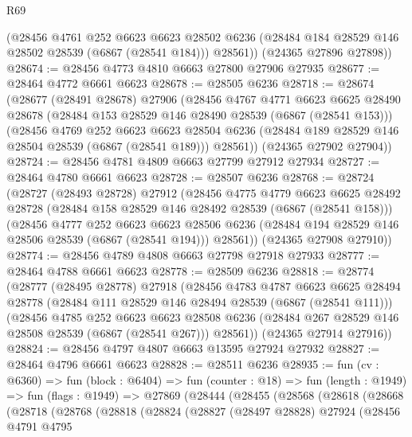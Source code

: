 \begin{lexlean}{R69}
\begin{coremodule}
{        (@28456
          @4761
          @252
          @6623
          @6623
          @28502
          @6236
          (@28484 @184 @28529 @146 @28502 @28539 (@6867 (@28541 @184)))
          @28561))
      (@24365 @27896 @27898))
@28674 := @28456 @4773 @4810 @6663 @27800 @27906 @27935
@28677 := @28464 @4772 @6661 @6623
@28678 := @28505 @6236
@28718 := @28674
    (@28677
      (@28491 @28678)
      @27906
      (@28456
        @4767
        @4771
        @6623
        @6625
        @28490
        @28678
        (@28484 @153 @28529 @146 @28490 @28539 (@6867 (@28541 @153)))
        (@28456
          @4769
          @252
          @6623
          @6623
          @28504
          @6236
          (@28484 @189 @28529 @146 @28504 @28539 (@6867 (@28541 @189)))
          @28561))
      (@24365 @27902 @27904))
@28724 := @28456 @4781 @4809 @6663 @27799 @27912 @27934
@28727 := @28464 @4780 @6661 @6623
@28728 := @28507 @6236
@28768 := @28724
    (@28727
      (@28493 @28728)
      @27912
      (@28456
        @4775
        @4779
        @6623
        @6625
        @28492
        @28728
        (@28484 @158 @28529 @146 @28492 @28539 (@6867 (@28541 @158)))
        (@28456
          @4777
          @252
          @6623
          @6623
          @28506
          @6236
          (@28484 @194 @28529 @146 @28506 @28539 (@6867 (@28541 @194)))
          @28561))
      (@24365 @27908 @27910))
@28774 := @28456 @4789 @4808 @6663 @27798 @27918 @27933
@28777 := @28464 @4788 @6661 @6623
@28778 := @28509 @6236
@28818 := @28774
    (@28777
      (@28495 @28778)
      @27918
      (@28456
        @4783
        @4787
        @6623
        @6625
        @28494
        @28778
        (@28484 @111 @28529 @146 @28494 @28539 (@6867 (@28541 @111)))
        (@28456
          @4785
          @252
          @6623
          @6623
          @28508
          @6236
          (@28484 @267 @28529 @146 @28508 @28539 (@6867 (@28541 @267)))
          @28561))
      (@24365 @27914 @27916))
@28824 := @28456 @4797 @4807 @6663 @13595 @27924 @27932
@28827 := @28464 @4796 @6661 @6623
@28828 := @28511 @6236
@28935 := fun (cv : @6360) =>
  fun (block : @6404) =>
  fun (counter : @18) =>
  fun (length : @1949) =>
  fun (flags : @1949) =>
  @27869
    (@28444
      (@28455
        (@28568
          (@28618
            (@28668
              (@28718
                (@28768
                  (@28818
                    (@28824
                      (@28827
                        (@28497 @28828)
                        @27924
                        (@28456
                          @4791
                          @4795
}
\end{coremodule}
\end{lexlean}
